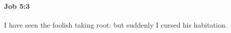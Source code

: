 
		\paragraph{Job 5:3} %
			\label{JOB-5-3}

			I have seen the foolish taking root: but suddenly I cursed his habitation.


